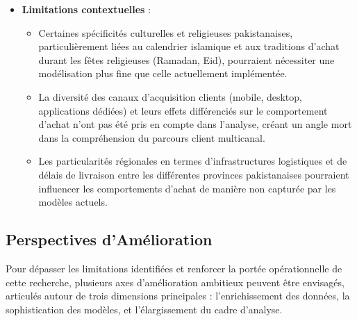 \documentclass[a4paper,12pt]{article}
\begin{document}
\begin{itemize}
    \item \textbf{Limitations contextuelles} :
    \begin{itemize}
        \item Certaines spécificités culturelles et religieuses pakistanaises, particulièrement liées au calendrier islamique et aux traditions d'achat durant les fêtes religieuses (Ramadan, Eid), pourraient nécessiter une modélisation plus fine que celle actuellement implémentée.
        
        \item La diversité des canaux d'acquisition clients (mobile, desktop, applications dédiées) et leurs effets différenciés sur le comportement d'achat n'ont pas été pris en compte dans l'analyse, créant un angle mort dans la compréhension du parcours client multicanal.
        
        \item Les particularités régionales en termes d'infrastructures logistiques et de délais de livraison entre les différentes provinces pakistanaises pourraient influencer les comportements d'achat de manière non capturée par les modèles actuels.
    \end{itemize}
\end{itemize}

\subsection{Perspectives d'Amélioration}

Pour dépasser les limitations identifiées et renforcer la portée opérationnelle de cette recherche, plusieurs axes d'amélioration ambitieux peuvent être envisagés, articulés autour de trois dimensions principales : l'enrichissement des données, la sophistication des modèles, et l'élargissement du cadre d'analyse.
\end{document}
